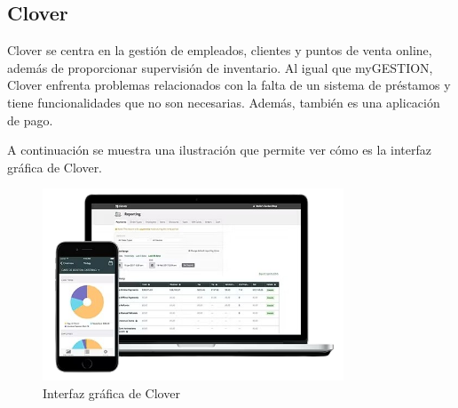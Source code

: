 \subsection{Clover}

Clover se centra en la gestión de empleados, clientes y puntos de venta online, además de proporcionar supervisión de inventario. Al igual que myGESTION, Clover enfrenta problemas relacionados con la falta de un sistema de préstamos y tiene funcionalidades que no son necesarias. Además, también es una aplicación de pago.

A continuación se muestra una ilustración que permite ver cómo es la interfaz gráfica de Clover. 

\begin{figure}[H]
	\centering
	\includegraphics[width=0.8\textwidth]{imagenes/aplicacionesSimilares/clover.png}
	\caption{Interfaz gráfica de Clover}
\end{figure}


